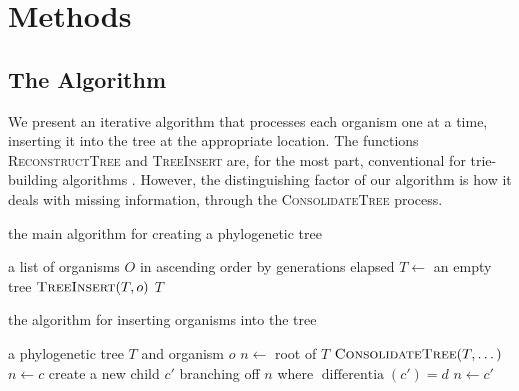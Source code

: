 \section{Methods} \label{sec:methods}

\subsection{The Algorithm} \label{sec:algorithm}

We present an iterative algorithm that processes each organism one at a time, inserting it into the tree at the appropriate location. The functions \textsc{ReconstructTree} and \textsc{TreeInsert} are, for the most part, conventional for trie-building algorithms \citep{crochemore2009trie}. However, the distinguishing factor of our algorithm is how it deals with missing information, through the \textsc{ConsolidateTree} process.

\begin{algorithm}[h]
    \caption{the main algorithm for creating a phylogenetic tree}
    \begin{algorithmic}[1]
        \Require a list of organisms $O$ in ascending order by generations elapsed
            \State $T \gets$ an empty tree
                \State $\textsc{TreeInsert}(T, o)$
            \EndFor
            \State \Return $T$
        \EndFunction
    \end{algorithmic}
\end{algorithm}

\begin{algorithm}[h]
    \caption{the algorithm for inserting organisms into the tree}
    \begin{algorithmic}[1]
        \Require a phylogenetic tree $T$ and organism $o$
            \State $n \gets$ root of $T$
                    \State $\textsc{ConsolidateTree}(T, \dotsc)$
                \EndIf
                    \State $n \gets c$
                \Else 
                    \State create a new child $c'$ branching off $n$ where $\operatorname{differentia}(c') = d$
                    \State $n \gets c'$
                \EndIf
            \EndFor
        \EndFunction
    \end{algorithmic}
\end{algorithm}

